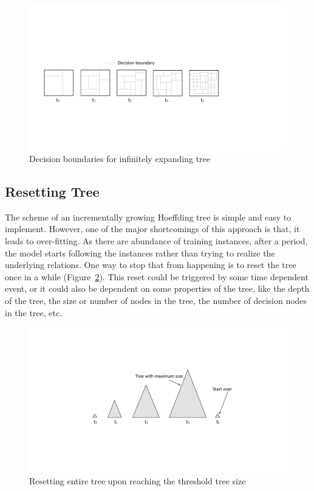 \begin{figure}[htbp]
    \begin{center}
        \includegraphics[width=14.0cm]{figs/infgrowdb.pdf}
        \caption{Decision boundaries for infinitely expanding tree}
        \label{fig:algo:infgrowdb}
    \end{center}
\end{figure}


\subsection{Resetting Tree}
The scheme of an incrementally growing Hoeffding tree is simple and easy to implement. However, one of the major shortcomings of this approach is that, it leads to over-fitting. As there are abundance of training instances, after a period, the model starts following the instances rather than trying to realize the underlying relations. One way to stop that from happening is to reset the tree once in a while (Figure~\ref{fig:algo:reset}). This reset could be triggered by some time dependent event, or it could also be dependent on some properties of the tree, like the depth of the tree, the size or number of nodes in the tree, the number of decision nodes in the tree, etc.

\begin{figure}[htbp]
    \begin{center}
        \includegraphics[width=12.0cm]{figs/reset.pdf}
        \caption{Resetting entire tree upon reaching the threshold tree size}
        \label{fig:algo:reset}
    \end{center}
\end{figure}


